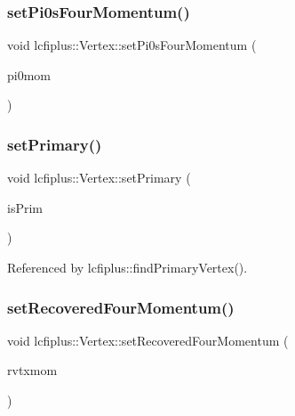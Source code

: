 \mbox{\label{classlcfiplus_1_1Vertex_acdfaf7631b3a1421a0944b7b88e7e4c9}} 
\subsubsection{set\+Pi0s\+Four\+Momentum()}
{\footnotesize\ttfamily void lcfiplus\+::\+Vertex\+::set\+Pi0s\+Four\+Momentum (\begin{DoxyParamCaption}\item[{T\+Lorentz\+Vector}]{pi0mom }\end{DoxyParamCaption})\hspace{0.3cm}{\ttfamily [inline]}}

\mbox{\label{classlcfiplus_1_1Vertex_a0e890130d15408ae6be6d13937e8bb3f}} 
\subsubsection{set\+Primary()}
{\footnotesize\ttfamily void lcfiplus\+::\+Vertex\+::set\+Primary (\begin{DoxyParamCaption}\item[{bool}]{is\+Prim }\end{DoxyParamCaption})\hspace{0.3cm}{\ttfamily [inline]}}



Referenced by lcfiplus\+::find\+Primary\+Vertex().

\mbox{\label{classlcfiplus_1_1Vertex_a81dd39a916b6ed7c8ea27a86b639be54}} 
\subsubsection{set\+Recovered\+Four\+Momentum()}
{\footnotesize\ttfamily void lcfiplus\+::\+Vertex\+::set\+Recovered\+Four\+Momentum (\begin{DoxyParamCaption}\item[{T\+Lorentz\+Vector}]{rvtxmom }\end{DoxyParamCaption})\hspace{0.3cm}{\ttfamily [inline]}}

